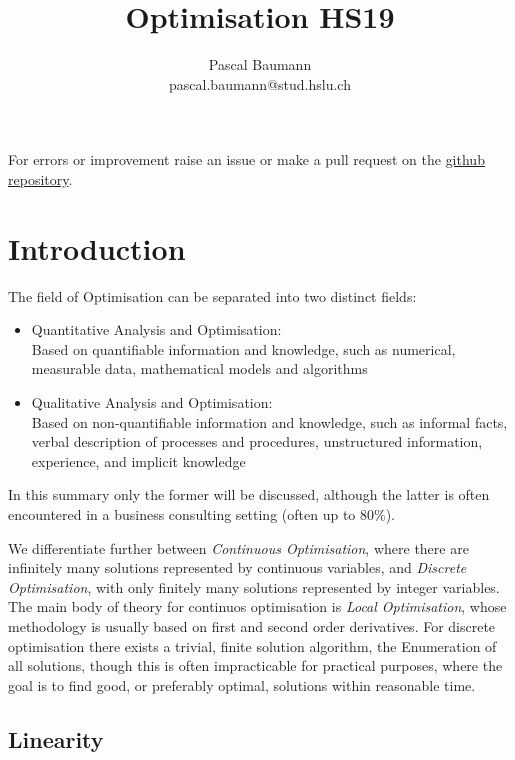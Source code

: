 \documentclass[11pt]{article}
\begin{document}
\title{Optimisation HS19}
\author{Pascal Baumann\\pascal.baumann@stud.hslu.ch}
\maketitle

For errors or improvement raise an issue or make a pull request on the \href{https://github.com/KilnOfTheSecondFlame/mse_summaries}{github repository}.

\tableofcontents

\newpage

\section{Introduction}
The field of Optimisation can be separated into two distinct fields:
\begin{itemize}
	\item Quantitative Analysis and Optimisation:\\
	Based on quantifiable information and knowledge, such as numerical, measurable data, mathematical models and algorithms
	\item Qualitative Analysis and Optimisation:\\
	Based on non-quantifiable information and knowledge, such as informal facts, verbal description of processes and procedures, unstructured information, experience, and implicit knowledge
\end{itemize}
In this summary only the former will be discussed, although the latter is often encountered in a business consulting setting (often up to 80\%).

We differentiate further between \emph{Continuous Optimisation}, where there are infinitely many solutions represented by continuous variables, and \emph{Discrete Optimisation}, with only finitely many solutions represented by integer variables. The main body of theory for continuos optimisation is \emph{Local Optimisation}, whose methodology is usually based on first and second order derivatives. For discrete optimisation there exists a trivial, finite solution algorithm, the Enumeration of all solutions, though this is often impracticable for practical purposes, where the goal is to find good, or preferably optimal, solutions within reasonable time.

\subsection{Linearity}
\end{document}
